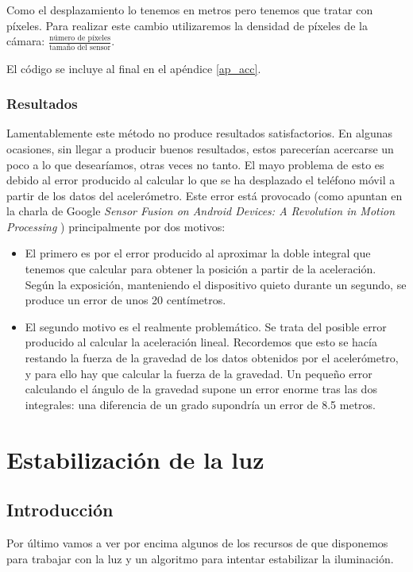 \documentclass[a4paper,openright, 12pt]{book}
\begin{document}
Como el desplazamiento lo tenemos en metros pero tenemos que tratar con píxeles. Para realizar este cambio utilizaremos la densidad de píxeles de la cámara: $\frac{ \text{número de píxeles}}{\text{tamaño del sensor}}$.


El código se incluye al final en el apéndice \ref{ap_acc}.
\newpage


\subsection{Resultados}
Lamentablemente este método no produce resultados satisfactorios. En algunas ocasiones, sin llegar a producir buenos resultados, estos parecerían acercarse un poco a lo que desearíamos, otras veces no tanto. El mayo problema de esto es debido al error producido al calcular lo que se ha desplazado el teléfono móvil a partir de los datos del acelerómetro.
Este error está provocado  (como apuntan en la charla de Google \textit{Sensor Fusion on Android Devices: A Revolution in Motion Processing} \cite{googlesensor}) principalmente por dos motivos:
\begin{itemize}
\item El primero es por el error producido al aproximar la doble integral que tenemos que calcular para obtener la posición a partir de la aceleración. Según la exposición, manteniendo el dispositivo quieto durante un segundo, se produce un error de unos 20 centímetros.
\item El segundo motivo es el realmente problemático. Se trata del posible error producido al calcular la aceleración lineal. Recordemos que esto se hacía restando la fuerza de la gravedad de los datos obtenidos por el acelerómetro, y para ello hay que calcular la fuerza de la gravedad. Un pequeño error calculando el ángulo de la gravedad supone un error enorme tras las dos integrales: una diferencia de un grado supondría un error de 8.5 metros.
\end{itemize}

\chapter{Estabilización de la luz} \label{cap.luz}
\section{Introducción}
Por último vamos a ver por encima algunos de los recursos de que disponemos para trabajar con la luz y un algoritmo para intentar estabilizar la iluminación.
\end{document}
